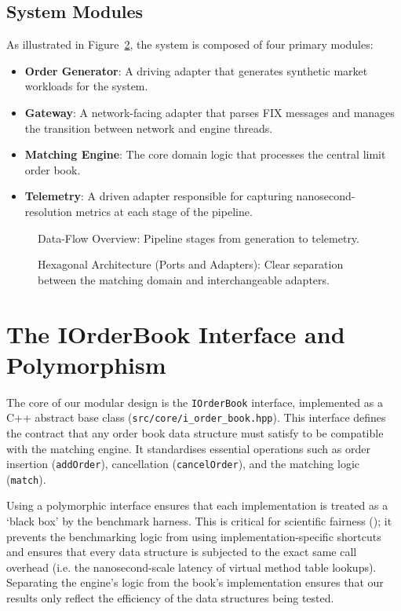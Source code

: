 \subsection{System Modules}
As illustrated in Figure~\ref{fig:hexagonal_architecture}, the system 
is composed of four primary modules:
\begin{itemize}
    \item \textbf{Order Generator}: A driving adapter that generates 
    synthetic market workloads for the system.
    \item \textbf{Gateway}: A network-facing adapter that parses FIX 
    messages and manages the transition between network and engine threads.
    \item \textbf{Matching Engine}: The core domain logic that processes 
    the central limit order book.
    \item \textbf{Telemetry}: A driven adapter responsible for capturing 
    nanosecond-resolution metrics at each stage of the pipeline.
\end{itemize}

\begin{figure}[H]
    \centering
    \resizebox{0.92\textwidth}{!}{}
    \caption{Data-Flow Overview: Pipeline stages from generation to telemetry.}
    \label{fig:high_level_architecture}
\end{figure}

\clearpage
\begin{figure}[H]
    \centering
    \resizebox{0.92\textwidth}{!}{}
    \caption{Hexagonal Architecture (Ports and Adapters): Clear separation between the matching domain and interchangeable adapters.}
    \label{fig:hexagonal_architecture}
\end{figure}

\section{The IOrderBook Interface and Polymorphism}
The core of our modular design is the \texttt{IOrderBook} interface, 
implemented as a C++ abstract base class (\texttt{src/core/i\_order\_book.hpp}).
This interface defines the contract that any order book data 
structure must satisfy to be compatible with the matching engine. It 
standardises essential operations such as order insertion 
(\texttt{addOrder}), cancellation (\texttt{cancelOrder}), and the matching 
logic (\texttt{match}).

Using a polymorphic interface ensures that each implementation is treated 
as a `black box' by the benchmark harness. This is critical for 
scientific fairness (); it prevents the benchmarking logic from 
using implementation-specific shortcuts and ensures that every data structure 
is subjected to the exact same call overhead (i.e. the nanosecond-scale 
latency of virtual method table lookups). Separating the engine's logic 
from the book's implementation ensures that our results only reflect 
the efficiency of the data structures being tested.

